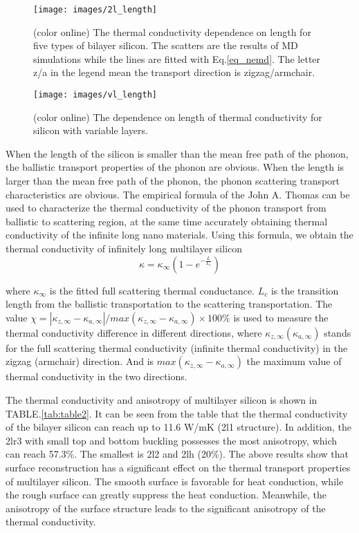 \documentclass[%
 reprint,
 amsmath,amssymb,
 aps,
 prb,
]{revtex4-1}
\begin{document}
\begin{figure}[b]
  \texttt{[image: images/2l\_length]}
  \caption{\label{fig:2l_length} (color online) The thermal conductivity dependence on length for five types of bilayer silicon. The scatters are the results of MD simulations while the lines are fitted with Eq.\ref{eq_nemd}. The letter z/a in the legend mean the transport direction is zigzag/armchair.}
\end{figure}

\begin{figure}[b]
  \texttt{[image: images/vl\_length]}
  \caption{\label{fig:vl_length}(color online) The dependence on length of thermal conductivity for silicon with variable layers.}
\end{figure}

When the length of the silicon is smaller than the mean free path of the phonon, the ballistic transport properties of the phonon are obvious. When the length is larger than the mean free path of the phonon, the phonon scattering transport characteristics are obvious. The empirical formula of the John A. Thomas\cite{Thomas2010} can be used to characterize the thermal conductivity of the phonon transport from ballistic to scattering region, at the same time accurately obtaining thermal conductivity of the infinite long nano materials. Using this formula, we obtain the thermal conductivity of infinitely long multilayer silicon
\begin{equation}
  \kappa = \kappa_\infty (1-e^{-\frac{L}{L_c}})
\end{equation}

where $\kappa_\infty$ is the fitted full scattering thermal conductance. $L_c$ is the transition length from the ballistic transportation to the scattering transportation. The value $ \chi=|\kappa_{z,\infty}-\kappa_{a,\infty} |/max⁡(\kappa_{z,\infty}-\kappa_{a,\infty} ) \times 100 \%$ is used to measure the thermal conductivity difference in different directions, where $ \kappa_{z,\infty} (\kappa_{a,\infty})$ stands for the full scattering thermal conductivity (infinite thermal conductivity) in the zigzag (armchair) direction. And is $ max⁡(\kappa_{z,\infty}-\kappa_{a,\infty} ) $ the maximum value of thermal conductivity in the two directions.

The thermal conductivity and anisotropy of multilayer silicon is shown in TABLE.\ref{tab:table2}. It can be seen from the table that the thermal conductivity of the bilayer silicon can reach up to 11.6 W/mK (2l1 structure). In addition, the 2lr3 with small top and bottom buckling possesses the most anisotropy, which can reach 57.3\%. The smallest is 2l2 and 2lh (20\%). The above results show that surface reconstruction has a significant effect on the thermal transport properties of multilayer silicon. The smooth surface is favorable for heat conduction, while the rough surface can greatly suppress the heat conduction. Meanwhile, the anisotropy of the surface structure leads to the significant anisotropy of the thermal conductivity.
\end{document}
